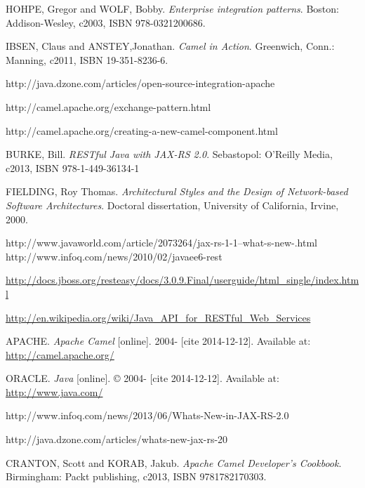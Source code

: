 \documentclass[12pt,final,oneside]{fithesis2}
\begin{document}



\begin{thebibliography}{}
 HOHPE, Gregor and WOLF, Bobby. \textit{Enterprise integration patterns}. Boston: Addison-Wesley, c2003, ISBN 978-0321200686.

 IBSEN, Claus and ANSTEY,Jonathan. \textit{Camel in Action}. Greenwich, Conn.: Manning, c2011, ISBN 19-351-8236-6.

 http://java.dzone.com/articles/open-source-integration-apache

 http://camel.apache.org/exchange-pattern.html

 http://camel.apache.org/creating-a-new-camel-component.html

 BURKE, Bill. \textit{RESTful Java with JAX-RS 2.0}. Sebastopol: O'Reilly Media, c2013, ISBN 978-1-449-36134-1

 FIELDING, Roy Thomas. \textit{Architectural Styles and the Design of Network-based Software Architectures}. Doctoral dissertation, University of California, Irvine, 2000. 

 http://www.javaworld.com/article/2073264/jax-rs-1-1--what-s-new-.html
 http://www.infoq.com/news/2010/02/javaee6-rest

\url{http://docs.jboss.org/resteasy/docs/3.0.9.Final/userguide/html_single/index.html}

 \url{http://en.wikipedia.org/wiki/Java_API_for_RESTful_Web_Services}

 APACHE. \textit{Apache Camel} [online]. 2004- [cite 2014-12-12]. Available at: \url{http://camel.apache.org/}

 ORACLE. \textit{Java} [online]. \copyright{} 2004- [cite 2014-12-12]. Available at: \url{http://www.java.com/}		

 http://www.infoq.com/news/2013/06/Whats-New-in-JAX-RS-2.0

 http://java.dzone.com/articles/whats-new-jax-rs-20 	

%
 CRANTON, Scott and KORAB, Jakub. \textit{Apache Camel Developer's Cookbook}.  Birmingham: Packt publishing, c2013, ISBN 9781782170303.
%
%




\end{thebibliography}
\end{document}

